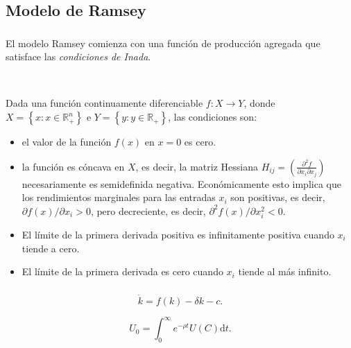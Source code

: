 \subsection{Modelo de Ramsey}

\begin{frame}
\frametitle{\subsecname}

El modelo Ramsey comienza con una función de producción agregada que satisface las \emph{condiciones de Inada}.

\

\begin{definition}
Dada una función continuamente diferenciable $f\colon X\rightarrow Y$, donde $X=\left\{x:x\in\mathds{R}^{n}_{+}\right\}$ e $Y=\left\{y:y\in\mathds{R}_{+}\right\}$, las condiciones son:
\begin{itemize}
	\item el valor de la función $f\left(x\right)$ en $x=0$ es cero.
	\item la función es \alert{cóncava} en $X$, es decir, la matriz Hessiana $H_{ij}=\left(\frac{\partial^{2}f}{\partial x_{i}\partial x_{j}}\right)$ necesariamente es semidefinida negativa. Económicamente esto implica que los rendimientos marginales para las entradas $x_{i}$ son positivas, es decir, $\partial f\left(x\right)/\partial x_{i}>0$, pero decreciente, es decir, $\partial^{2}f\left(x\right)/\partial x^{2}_{i}<0$.
	\item El límite de la primera derivada positiva es infinitamente positiva cuando $x_{i}$ tiende a cero.
	\item El límite de la primera derivada es cero cuando $x_{i}$ tiende al más infinito.
\end{itemize}
\end{definition}
\end{frame}

\begin{frame}
\frametitle{\subsecname}
\begin{definition}
\begin{equation}
\dot{k}=f\left(k\right)-\delta k-c.
\end{equation}

\begin{equation}
U_{0}=\int_{0}^{\infty}e^{-\rho t}U\left(C\right)\mathrm{d}t.
\end{equation}
\end{definition}

\end{frame}